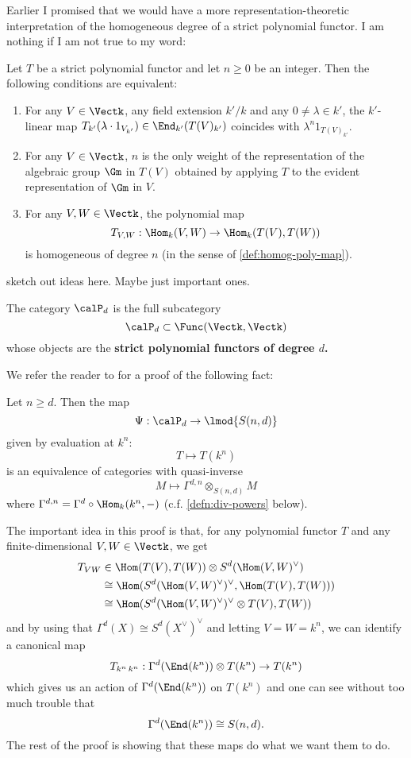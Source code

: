 \documentclass[12pt]{article}
\begin{document}
Earlier I promised that we would have a more representation-theoretic interpretation of the homogeneous degree 
of a strict polynomial functor. I am nothing if I am not true to my word:
\begin{lem}
	Let $T$ be a strict polynomial functor and let $n\ge 0$ be an integer. Then the following conditions are equivalent:
	\begin{enumerate}
		\item For any $V\in\Vectk$, any field extension $k'/k$ and any $0\ne\lambda\in k'$, the $k'$-linear 
		map $T_{k'}(\lambda\cdot 1_{V_{k'}})\in\End_{k'}(T(V)_{k'})$ coincides with $\lambda^n1_{T(V)_{k'}}$.
		\item For any $V\in\Vectk$, $n$ is the only weight of the representation of the algebraic group $\Gm$ in $T(V)$
		obtained by applying $T$ to the evident representation of $\Gm$ in $V$.
		\item For any $V,W\in\Vectk$, the polynomial map 
		\[T_{V,W}:\Hom_k(V,W)\to \Hom_k(T(V),T(W))\] 
		is homogeneous of degree $n$ (in the sense of \ref{def:homog-poly-map}).
	\end{enumerate}
\end{lem}
\begin{prf}
	\color{red} sketch out ideas here. Maybe just important ones.
\end{prf}

\begin{defn}
	The category $\calP_d$ is the full subcategory 
	\[\calP_d\subset\Func(\Vectk,\Vectk)\]
	whose objects are the \textbf{strict polynomial functors of degree $d$.}
\end{defn}

We refer the reader to \cite[Thm. 3.2]{friedlander-suslin} for a proof of the following fact:
\begin{thm}\label{thm:FS-equiv}
	Let $n\ge d$. Then the map
	\[\Psi:\calP_d\to \lmod {S(n,d)}\]
	given by evaluation at $k^n$:
	\[T\mapsto T(k^n)\]
	is an equivalence of categories with quasi-inverse 
	\[M\mapsto\Gamma^{d,n}\otimes_{S(n,d)}M\]
	where $\Gamma^{d,n}=\Gamma^d\circ\Hom_k(k^n,-)$ (c.f. \ref{defn:div-powers} below).
\end{thm}

The important idea in this proof is that, for any polynomial functor $T$ and any finite-dimensional $V,W\in\Vectk$,
we get 
\begin{align*}T_{VW}&\in\Hom(T(V),T(W))\otimes S^d(\Hom(V,W)^\vee)\\
	&\cong\Hom(S^d(\Hom(V,W)^\vee)^\vee,\Hom(T(V),T(W)))\\
	&\cong\Hom(S^d(\Hom(V,W)^\vee)^\vee\otimes T(V),T(W))
\end{align*}
and by using that $\Gamma^d(X)\cong S^d(X^\vee)^\vee$ and letting $V=W=k^n$, we can identify a canonical map 
\[T_{k^n\,k^n}:\Gamma^d(\End(k^n))\otimes T(k^n)\to T(k^n)\]
which gives us an action of $\Gamma^d(\End(k^n))$ on $T(k^n)$ and one can see without too much trouble that 
\[\Gamma^d(\End(k^n))\cong S(n,d).\]
The rest of the proof is showing that these maps do what we want them to do.
\end{document}
